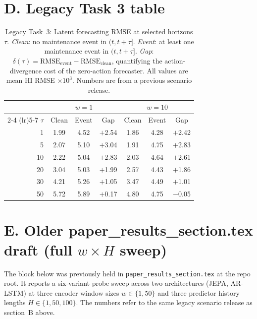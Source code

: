 \section*{D. Legacy Task 3 table}

\begin{table}[h]
\centering
\caption{%
  Legacy Task~3: Latent forecasting RMSE at selected horizons $\tau$.
  \emph{Clean}: no maintenance event in $(t, t{+}\tau]$.
  \emph{Event}: at least one maintenance event in $(t, t{+}\tau]$.
  \emph{Gap}: $\delta(\tau) = \mathrm{RMSE}_\mathrm{event} -
  \mathrm{RMSE}_\mathrm{clean}$, quantifying the action-divergence cost of the zero-action forecaster. All values are mean HI RMSE $\times 10^{3}$.
  Numbers are from a previous scenario release.
}
\label{tab:legacy_task3}
\setlength{\tabcolsep}{5pt}
\begin{tabular}{r ccc ccc}
\toprule
& \multicolumn{3}{c}{$w = 1$} & \multicolumn{3}{c}{$w = 10$} \\
\cmidrule(lr){2-4} \cmidrule(lr){5-7}
$\tau$ & Clean & Event & Gap & Clean & Event & Gap \\
\midrule
 1  & 1.99 & 4.52 & $+$2.54 & 1.86 & 4.28 & $+$2.42 \\
 5  & 2.07 & 5.10 & $+$3.04 & 1.91 & 4.75 & $+$2.83 \\
10  & 2.22 & 5.04 & $+$2.83 & 2.03 & 4.64 & $+$2.61 \\
20  & 3.04 & 5.03 & $+$1.99 & 2.57 & 4.43 & $+$1.86 \\
30  & 4.21 & 5.26 & $+$1.05 & 3.47 & 4.49 & $+$1.01 \\
50  & 5.72 & 5.89 & $+$0.17 & 4.80 & 4.75 & $-$0.05 \\
\bottomrule
\end{tabular}
\end{table}


\section*{E. Older paper\_results\_section.tex draft (full $w \times H$ sweep)}

The block below was previously held in \texttt{paper\_results\_section.tex}
at the repo root. It reports a six-variant probe sweep across two
architectures (JEPA, AR-LSTM) at three encoder window sizes
$w \in \{1, 50\}$ and three predictor history lengths
$H \in \{1, 50, 100\}$. The numbers refer to the same legacy scenario
release as section~B above.

